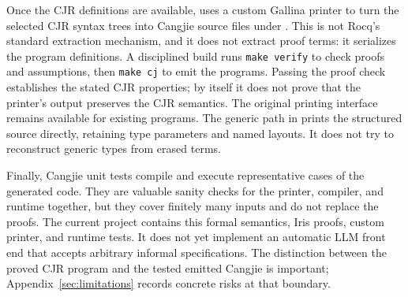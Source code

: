\documentclass[11pt]{article}
\begin{document}
Once the CJR definitions are available, 
uses a custom Gallina printer to turn the selected CJR syntax trees into
Cangjie source files under .  This is not Rocq's
standard extraction mechanism, and it does not extract proof terms: it
serializes the program definitions.  A disciplined build runs
\texttt{make verify} to check proofs and assumptions, then \texttt{make cj}
to emit the programs.  Passing the proof check establishes the stated CJR
properties; by itself it does not prove that the printer's output preserves
the CJR semantics.
The original printing interface remains available for existing programs.
The generic path in  prints the
structured source directly, retaining type parameters and named layouts.
It does not try to reconstruct generic types from erased terms.

Finally, Cangjie unit tests compile and execute representative cases of the
generated code.  They are valuable sanity checks for the printer, compiler,
and runtime together, but they cover finitely many inputs and do not replace
the proofs.  The current project contains this formal semantics, Iris
proofs, custom printer, and runtime tests.  It does not yet implement an
automatic LLM front end that accepts arbitrary informal specifications.
The distinction between the proved CJR program and the tested emitted
Cangjie is important; Appendix~\ref{sec:limitations} records concrete risks
at that boundary.
\end{document}
